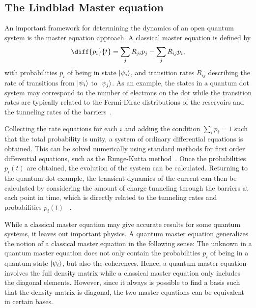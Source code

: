 \documentclass[../main.tex]{subfiles}
\begin{document}
\subsection{The Lindblad Master equation}\label{sec:lind}
An important framework for determining the dynamics of an open quantum system is the master equation approach. A classical master equation is defined by
\begin{equation}\label{master}
    \diff{p_i}{t} = \sum_j R_{ji}p_j  - \sum_j R_{ij}p_i,
\end{equation}
with probabilities $p_i$ of being in state $\ket{\psi_i}$, and transition rates $R_{ij}$ describing the rate of transitions from $\ket{\psi_i}$ to $\ket{\psi_j}$. As an example, the states in a quantum dot system may correspond to the number of electrons on the dot while the transition rates are typically related to the Fermi-Dirac distributions of the reservoirs and the tunneling rates of the barriers~\cite{transport}.

Collecting the rate equations for each $i$ and adding the condition $\sum_i p_i = 1$ such that the total probability is unity, a system of ordinary differential equations is obtained. This can be solved numerically using standard methods for first order differential equations, such as the Runge-Kutta method~\cite{iserles}. Once the probabilities $p_i(t)$ are obtained, the evolution of the system can be calculated. Returning to the quantum dot example, the transient dynamics of the current can then be calculated by considering the amount of charge tunneling through the barriers at each point in time, which is directly related to the tunneling rates and probabilities $p_i(t)$ ~\cite{transport}.

While a classical master equation may give accurate results for some quantum systems, it leaves out important physics. A quantum master equation generalizes the notion of a classical master equation in the following sense: The unknown in a quantum master equation does not only contain the probabilities $p_i$ of being in a quantum state $\ket{\psi_i}$, but also the coherences. Hence, a quantum master equation involves the full density matrix while a classical master equation only includes the diagonal elements. However, since it always is possible to find a basis such that the density matrix is diagonal, the two master equations can be equivalent in certain bases.
\end{document}
